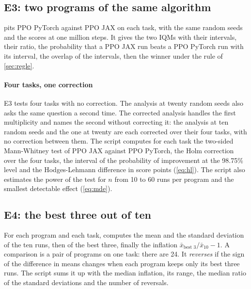 \subsection{E3: two programs of the same algorithm}\label{sec:plan-e3}
 pits PPO PyTorch against PPO JAX on each task, with the same random seeds and the
scores at one million steps. It gives the two IQMs with their intervals, their ratio, the
probability that a PPO JAX run beats a PPO PyTorch run with its interval, the overlap of the intervals, then
the winner under the rule of \cref{sec:regle}.

\paragraph{Four tasks, one correction}
E3 tests four tasks with no correction. The analysis at twenty random seeds also asks the same question a second
time. The corrected analysis handles the first multiplicity and names the second without correcting it: the
analysis at ten random seeds and the one at twenty are each corrected over their four tasks, with no correction
between them. The script  computes for
each task the two-sided Mann-Whitney test of PPO JAX against PPO PyTorch, the Holm correction over the four
tasks, the interval of the probability of improvement at the 98.75\% level and the Hodges-Lehmann difference in
score points (\cref{eq:hl}). The script also estimates the power of the test for $n$ from 10 to 60 runs per program and the smallest
detectable effect (\cref{eq:mde}).

\subsection{E4: the best three out of ten}\label{sec:plan-e4}
For each program and each task,  computes the mean and the standard deviation of the
ten runs, then of the best three, finally the inflation $\bar x_{\text{best 3}}/\bar x_{10}-1$. A
comparison is a pair of programs on one task: there are 24. It \emph{reverses} if the sign of the difference in
means changes when each program keeps only its best three runs. The script sums it up with the median inflation, its
range, the median ratio of the standard deviations and the number of reversals.

